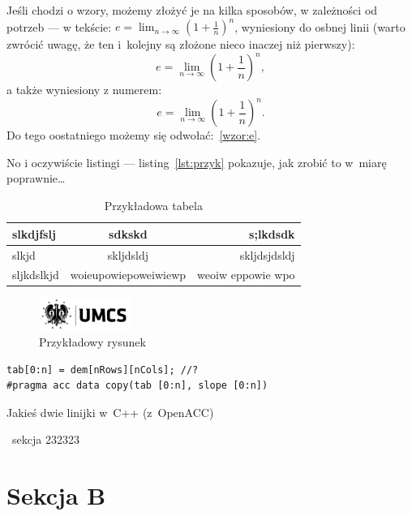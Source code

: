 \documentclass[a4paper,12pt]{book} %
\begin{document}
Jeśli chodzi o wzory, możemy złożyć je na kilka sposobów, w zależności od potrzeb --- w tekście: $e=\lim_{n\to\infty}\left(1+\frac{1}{n}\right)^n$, wyniesiony do osbnej linii
(warto zwrócić uwagę, że ten i~kolejny są złożone nieco inaczej niż pierwszy):
\[e=\lim_{n\to\infty}\left(1+\frac{1}{n}\right)^n,\] a także wyniesiony z numerem:
\begin{equation}
    e=\lim_{n\to\infty}\left(1+\frac{1}{n}\right)^n.
    \label{wzor:e}
\end{equation}
Do tego oostatniego możemy się odwołać:~\eqref{wzor:e}.

No i oczywiście listingi --- listing~\ref{lst:przyk} pokazuje, jak zrobić to w~miarę poprawnie\ldots{}

\begin{table}[t]
    \begin{center}
        \caption{Przykładowa tabela}\label{tab:przyk}
        \begin{tabular}{l|c|r}
            slkdjfslj  & sdkskd               & s;lkdsdk          \\
            \hline
            slkjd      & skljdsldj            & skljdsjdsldj      \\
            sljkdslkjd & woieupowiepoweiwiewp & weoiw eppowie wpo \\
        \end{tabular}
    \end{center}
\end{table}

\begin{figure}[b]
    \begin{center}
        \includegraphics[width=3cm]{LogoUMCS}
    \end{center}
    \caption{Przykładowy rysunek}\label{rys:przyk}
\end{figure}


\begin{lstfloat}[b]
    \lstset{language=C++}
    \begin{lstlisting}[frame=single]
tab[0:n] = dem[nRows][nCols]; //?
#pragma acc data copy(tab [0:n], slope [0:n])
\end{lstlisting}
    \caption{Jakieś dwie linijki w~C++ (z~OpenACC)}\label{lst:przyk}
\end{lstfloat}
\
sekcja 232323
\

\section{Sekcja B}
\end{document}
